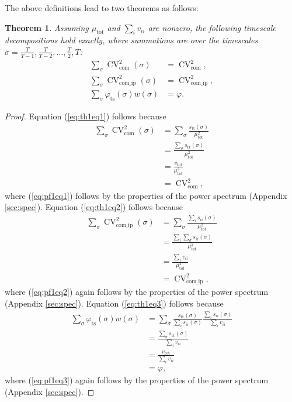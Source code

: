 \documentclass[letterpaper,11pt]{article}
\newcommand{\CV}{{\operatorname{CV}}}
\newcommand{\com}{{\operatorname{com}}}
\newcommand{\comip}{{\operatorname{com\_ip}}}
\newcommand{\ts}{{\operatorname{ts}}}
\newtheorem{theorem}{Theorem}[]
\begin{document}
The above definitions lead to two theorems as follows:
\begin{theorem}\label{thm:freqdecom}
Assuming $\mu_{\text{tot}}$ and $\sum_i v_{ii}$ are nonzero, the following timescale decompositions hold exactly, where summations are over the
timescales $\sigma=\frac{T}{T-1},\frac{T}{T-2},\ldots,\frac{T}{2},T$:
\begin{align}
\sum_{\sigma}\CV_{\com}^2(\sigma) &= \CV_{\com}^2, \label{eq:th1eq1}\\
\sum_{\sigma}\CV_{\comip}^2(\sigma) &= \CV_{\comip}^2, \label{eq:th1eq2}\\
\sum_{\sigma}\varphi_{\ts}(\sigma) w(\sigma) &= \varphi. \label{eq:th1eq3}
\end{align}
\end{theorem}
\begin{proof}
Equation (\ref{eq:th1eq1}) follows because
\begin{align}
\sum_{\sigma}\CV_{\com}^2(\sigma) &= \sum_{\sigma} \frac{s_{\text{tt}}(\sigma)}{\mu_{\text{tot}}^2} \\
&= \frac{\sum_{\sigma}  s_{\text{tt}}(\sigma)}{\mu_{\text{tot}}^2} \\
&= \frac{v_{\text{tot}}}{\mu_{\text{tot}}^2} \label{eq:pf1eq1}\\
&= \CV_{\com}^2,
\end{align}
where (\ref{eq:pf1eq1}) follows by the properties of the power spectrum (Appendix
\ref{sec:spec}). Equation (\ref{eq:th1eq2}) follows because
\begin{align}
\sum_{\sigma}\CV_{\comip}^2(\sigma) &= \sum_{\sigma} \frac{\sum_i s_{ii}(\sigma)}{\mu_{\text{tot}}^2} \\
&= \frac{\sum_i \sum_\sigma s_{ii}(\sigma)}{\mu_{\text{tot}}^2} \\
&= \frac{\sum_i v_{ii}}{\mu_{\text{tot}}^2} \label{eq:pf1eq2}\\
&= \CV_{\comip}^2,
\end{align}
where (\ref{eq:pf1eq2}) again follows by the properties of the power spectrum
(Appendix \ref{sec:spec}). Equation (\ref{eq:th1eq3}) follows because
\begin{align}
\sum_{\sigma}\varphi_{\ts}(\sigma) w(\sigma) &= \sum_{\sigma} \frac{s_{\text{tt}}(\sigma)}{\sum_i s_{ii}(\sigma)}
 \frac{\sum_i s_{ii}(\sigma)}{\sum_i v_{ii}} \\
&= \frac{\sum_{\sigma} s_{\text{tt}}(\sigma)}{\sum_i v_{ii}} \\
&= \frac{v_{\text{tot}}}{\sum_i v_{ii}} \label{eq:pf1eq3}\\
&= \varphi, 
\end{align}
where (\ref{eq:pf1eq3}) again follows by the properties of the power spectrum
(Appendix \ref{sec:spec}). 
\end{proof}
\end{document}
